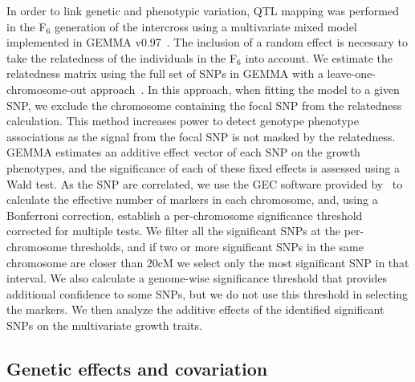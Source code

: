 \begin{refsection}
In order to link genetic and phenotypic variation, QTL mapping was performed
in the F$_{\text{6}}$ generation of the intercross using a multivariate mixed model
implemented in GEMMA v0.97~\parencite{Zhou2014-op}. The inclusion of a random
effect is necessary to take the relatedness of the individuals in the F$_{\text{6}}$ into
account. We estimate the relatedness matrix using the full set of SNPs in
GEMMA with a leave-one-chromosome-out approach~\parencite{Yang2014-hl}. In
this approach, when fitting the model to a given SNP, we exclude the
chromosome containing the focal SNP from the relatedness calculation. This
method increases power to detect genotype phenotype associations as the signal
from the focal SNP is not masked by the relatedness. GEMMA estimates an
additive effect vector of each SNP on the growth phenotypes, and the
significance of each of these fixed effects is assessed using a Wald test. As
the SNP are correlated, we use the GEC software provided
by~\textcite{Li2012-wl} to calculate the effective number of markers in each
chromosome, and, using a Bonferroni correction, establish a per-chromosome
significance threshold corrected for multiple tests. We filter all the
significant SNPs at the per-chromosome thresholds, and if two or more
significant SNPs in the same chromosome are closer than 20cM we select only
the most significant SNP in that interval. We also calculate a genome-wise
significance threshold that provides additional confidence to some SNPs, but
we do not use this threshold in selecting the markers. We then analyze the
additive effects of the identified significant SNPs on the multivariate growth
traits.

\subsection{Genetic effects and covariation}


\end{refsection}

